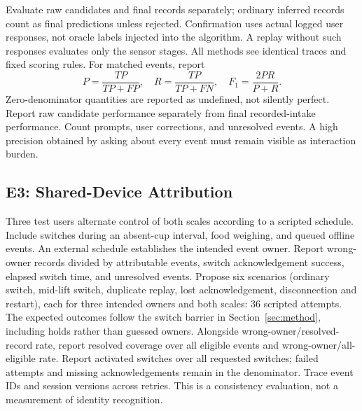 Evaluate raw candidates and final records separately; ordinary inferred records count as final predictions unless rejected. Confirmation uses actual logged user responses, not oracle labels injected into the algorithm. A replay without such responses evaluates only the sensor stages. All methods see identical traces and fixed scoring rules. For matched events, report
\begin{equation}P=\frac{TP}{TP+FP},\quad R=\frac{TP}{TP+FN},\quad
F_1=\frac{2PR}{P+R}.\label{eq:detection}\end{equation}
Zero-denominator quantities are reported as undefined, not silently perfect. Report raw candidate performance separately from final recorded-intake performance. Count prompts, user corrections, and unresolved events. A high precision obtained by asking about every event must remain visible as interaction burden.

\subsection{E3: Shared-Device Attribution}
Three test users alternate control of both scales according to a scripted schedule. Include switches during an absent-cup interval, food weighing, and queued offline events. An external schedule establishes the intended event owner. Report wrong-owner records divided by attributable events, switch acknowledgement success, elapsed switch time, and unresolved events. Propose six scenarios (ordinary switch, mid-lift switch, duplicate replay, lost acknowledgement, disconnection and restart), each for three intended owners and both scales: 36 scripted attempts. The expected outcomes follow the switch barrier in Section~\ref{sec:method}, including holds rather than guessed owners. Alongside wrong-owner/resolved-record rate, report resolved coverage over all eligible events and wrong-owner/all-eligible rate. Report activated switches over all requested switches; failed attempts and missing acknowledgements remain in the denominator. Trace event IDs and session versions across retries. This is a consistency evaluation, not a measurement of identity recognition.

